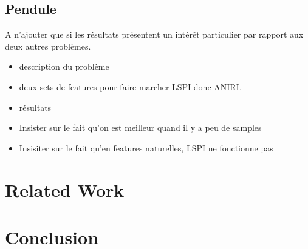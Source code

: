 \documentclass{article} %
\newcommand{\0}{\mathbf{0}}
\newcommand{\1}{\mathbf{1}}
\begin{document}
\subsection{Pendule}
A n'ajouter que si les résultats présentent un intérêt particulier par rapport aux deux autres problèmes.


\begin{itemize}
\item description du problème
\item deux sets de features pour faire marcher LSPI donc ANIRL
\item résultats
\item Insister sur le fait qu'on est meilleur quand il y a peu de samples
\item Insisiter sur le fait qu'en features naturelles, LSPI ne fonctionne pas
\end{itemize}
\section{Related Work}
\label{section: related work}

\section{Conclusion}



\end{document}
